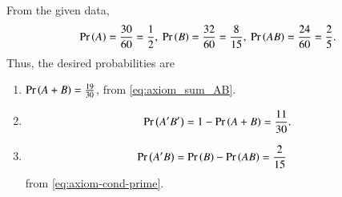     From the given data, 
    \begin{align}
        \pr{A} = \frac{30}{60} = \frac{1}{2},\ 
        \pr{B} = \frac{32}{60} = \frac{8}{15},\ 
        \pr{AB}= \frac{24}{60} = \frac{2}{5}.
    \end{align}
    Thus, the desired probabilities are
\begin{enumerate}
	\item $\Pr\left(A+B\right)=\frac{19}{30}$, from 
\eqref{eq:axiom_sum_AB}.
	\item
        \begin{align}
\Pr\left(A^\prime  B^\prime \right) =1-\Pr\left(A+B\right)= \frac{11}{30}.
\end{align}
	\item
    \begin{align}
	    \Pr\left(A^\prime B\right)        &= \Pr\left(B\right) - \Pr\left(AB\right) = \frac{2}{15} 
    \end{align}
    from
\eqref{eq:axiom-cond-prime}.
\end{enumerate}
